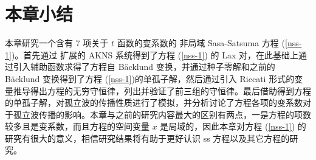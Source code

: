 \section{本章小结}
本章研究一个含有 7 项关于 $t$ 函数的变系数的 非局域 Sasa-Satsuma 方程 (\ref{nss-1})。首先通过 扩展的 AKNS 系统得到了方程 (\ref{nss-1}) 的 Lax 对，在此基础上通过引入辅助函数求得了方程自 B\"{a}cklund 变换，并通过种子零解和之前的 B\"{a}cklund 变换得到了方程 (\ref{nss-1})的单孤子解，然后通过引入 Riccati 形式的变量推导得出方程的无穷守恒律，列出并验证了前三组的守恒律。最后借助得到方程的单孤子解，对孤立波的传播性质进行了模拟，并分析讨论了方程各项的变系数对于孤立波传播的影响。本章与之前的研究内容最大的区别有两点，一是方程的项数较多且是变系数，而且方程的空间变量 $x$ 是局域的，因此本章对方程 (\ref{nss-1}) 的研究有很大的意义，相信研究结果将有助于更好认识 ss 方程以及其它方程的研究。